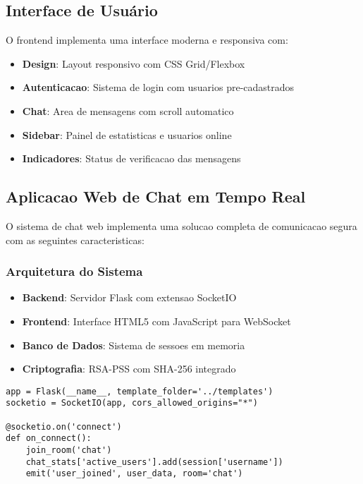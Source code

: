 \documentclass[12pt,a4paper,oneside]{article}
\begin{document}
\subsection{Interface de Usuário}

O frontend implementa uma interface moderna e responsiva com:

\begin{itemize}
    \item \textbf{Design}: Layout responsivo com CSS Grid/Flexbox
    \item \textbf{Autenticacao}: Sistema de login com usuarios pre-cadastrados
    \item \textbf{Chat}: Area de mensagens com scroll automatico
    \item \textbf{Sidebar}: Painel de estatisticas e usuarios online
    \item \textbf{Indicadores}: Status de verificacao das mensagens
\end{itemize}

\subsection{Aplicacao Web de Chat em Tempo Real}

O sistema de chat web implementa uma solucao completa de comunicacao segura com as seguintes caracteristicas:

\subsubsection{Arquitetura do Sistema}

\begin{itemize}
    \item \textbf{Backend}: Servidor Flask com extensao SocketIO
    \item \textbf{Frontend}: Interface HTML5 com JavaScript para WebSocket
    \item \textbf{Banco de Dados}: Sistema de sessoes em memoria
    \item \textbf{Criptografia}: RSA-PSS com SHA-256 integrado
\end{itemize}

\begin{lstlisting}[caption=Configuracao do servidor Flask com WebSocket]
app = Flask(__name__, template_folder='../templates')
socketio = SocketIO(app, cors_allowed_origins="*")

@socketio.on('connect')
def on_connect():
    join_room('chat')
    chat_stats['active_users'].add(session['username'])
    emit('user_joined', user_data, room='chat')
\end{lstlisting}
\end{document}
